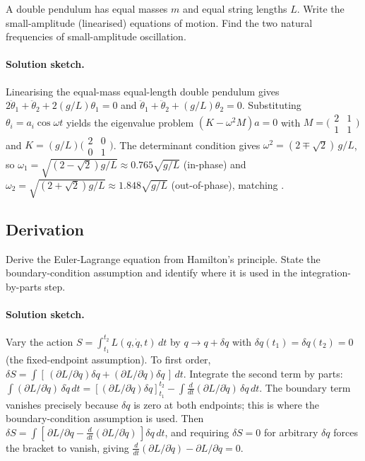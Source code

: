 \begin{exercise}
A double pendulum has equal masses $m$ and equal string lengths $L$.
Write the small-amplitude (linearised) equations of motion. Find the
two natural frequencies of small-amplitude oscillation.

\paragraph{Solution sketch.} Linearising the equal-mass equal-length
double pendulum gives $2\ddot{\theta}_1 + \ddot{\theta}_2 +
2(g/L)\theta_1 = 0$ and $\ddot{\theta}_1 + \ddot{\theta}_2 +
(g/L)\theta_2 = 0$. Substituting $\theta_i = a_i\cos\omega t$ yields the
eigenvalue problem $(K - \omega^2 M)a = 0$ with $M =
\bigl(\begin{smallmatrix}2&1\\1&1\end{smallmatrix}\bigr)$ and
$K = (g/L)\bigl(\begin{smallmatrix}2&0\\0&1\end{smallmatrix}\bigr)$. The
determinant condition gives $\omega^2 = (2\mp\sqrt2)\,g/L$, so
$\omega_1 = \sqrt{(2-\sqrt2)g/L} \approx 0.765\sqrt{g/L}$ (in-phase) and
$\omega_2 = \sqrt{(2+\sqrt2)g/L} \approx 1.848\sqrt{g/L}$ (out-of-phase),
matching .
\end{exercise}

\subsection*{Derivation}

\begin{exercise}
Derive the Euler-Lagrange equation from Hamilton's principle.
State the boundary-condition assumption and identify where it is
used in the integration-by-parts step.

\paragraph{Solution sketch.} Vary the action $S = \int_{t_1}^{t_2}
L(q,\dot q,t)\,dt$ by $q\to q+\delta q$ with $\delta q(t_1) = \delta
q(t_2) = 0$ (the fixed-endpoint assumption). To first order, $\delta S =
\int [\,(\partial L/\partial q)\delta q + (\partial L/\partial\dot
q)\delta\dot q\,]\,dt$. Integrate the second term by parts:
$\int (\partial L/\partial\dot q)\,\delta\dot q\,dt = [(\partial
L/\partial\dot q)\delta q]_{t_1}^{t_2} - \int \tfrac{d}{dt}(\partial
L/\partial\dot q)\,\delta q\,dt$. The boundary term vanishes precisely
because $\delta q$ is zero at both endpoints; this is where the
boundary-condition assumption is used. Then $\delta S = \int [\,\partial
L/\partial q - \tfrac{d}{dt}(\partial L/\partial\dot q)\,]\delta q\,dt$,
and requiring $\delta S = 0$ for arbitrary $\delta q$ forces the
bracket to vanish, giving $\tfrac{d}{dt}(\partial L/\partial\dot q) -
\partial L/\partial q = 0$.
\end{exercise}

